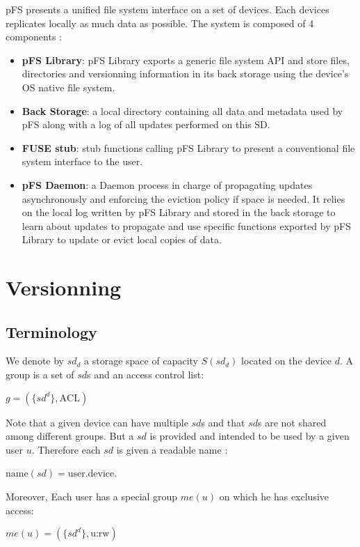 \documentclass[letterpaper,twocolumn,10pt]{article}
\begin{document}
pFS presents a unified file system interface on a set of devices. Each
devices replicates locally as much data as possible. The system is
composed of 4 components :
\begin{itemize}
\item \textbf{pFS Library}: pFS Library exports a generic file system
  API and store files, directories and versionning information in its
  back storage using the device's OS native file system.
\item \textbf{Back Storage}: a local directory containing all data and
  metadata used by pFS along with a log of all updates performed on
  this SD.
\item \textbf{FUSE stub}: stub functions calling pFS Library to
  present a conventional file system interface to the user.
\item \textbf{pFS Daemon}: a Daemon process in charge of propagating
  updates asynchronously and enforcing the eviction policy if space is
  needed. It relies on the local log written by pFS Library and stored
  in the back storage to learn about updates to propagate and use
  specific functions exported by pFS Library to update or evict local
  copies of data.
\end{itemize}


\section{Versionning}

\subsection{Terminology}

We denote by $sd_{d}$ a storage space of capacity $S(sd_{d})$
located on the device $d$. A group is a set of $sd$s and an
access control list:
\begin{center}
$g = (\{sd^{d}\}, \text{ACL})$
\end{center}
Note that a given device can have multiple $sd$s and that $sd$s are
not shared among different groups. But a $sd$ is provided and intended
to be used by a given user $u$. Therefore each $sd$ is given a
readable name :
\begin{center}
$\text{name}(sd) = \text{user}.\text{device}$. 
\end{center}
Moreover, Each user has a special group $me(u)$ on which he has
exclusive access:
\begin{center}
$me(u) = (\{sd^{d}\}, \text{u:rw})$
\end{center}
\end{document}
